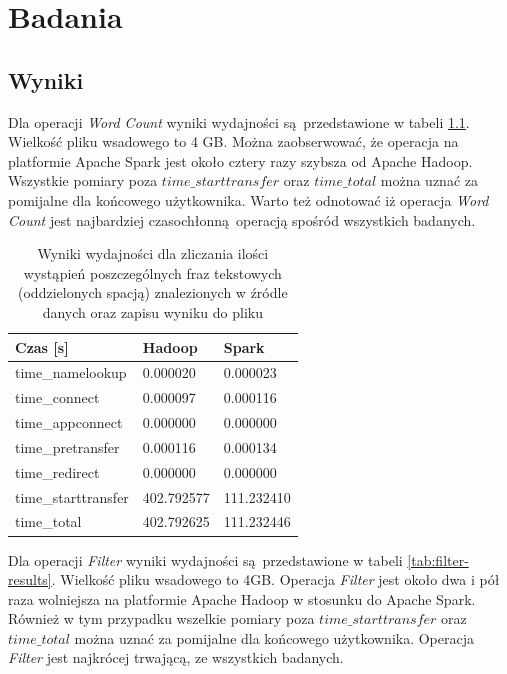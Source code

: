 \chapter{Badania}\label{chap.research}
\section{Wyniki}
Dla operacji \textit{Word Count} wyniki wydajności są przedstawione w tabeli \ref{tab:word-count-results}. Wielkość pliku wsadowego to 4 GB. Można zaobserwować, że operacja na platformie Apache Spark jest około cztery razy szybsza od Apache Hadoop. Wszystkie pomiary poza $time\_starttransfer$ oraz $time\_total$ można uznać za pomijalne dla końcowego użytkownika. Warto też odnotować iż operacja \textit{Word Count} jest najbardziej czasochłonną operacją spośród wszystkich badanych.  
\begin{table}[]
	\centering
	\caption{Wyniki wydajności dla zliczania ilości wystąpień poszczególnych fraz tekstowych (oddzielonych spacją) znalezionych w źródle danych oraz zapisu wyniku do pliku}
	\label{tab:word-count-results}
	\begin{tabular}{|l|l|l|}
		\hline
		Czas [s]    & Hadoop     & Spark      \\ \hline
		time\_namelookup    & 0.000020   & 0.000023   \\ \hline
		time\_connect       & 0.000097   & 0.000116   \\ \hline
		time\_appconnect    & 0.000000   & 0.000000   \\ \hline
		time\_pretransfer   & 0.000116   & 0.000134   \\ \hline
		time\_redirect      & 0.000000   & 0.000000   \\ \hline
		time\_starttransfer & 402.792577 & 111.232410 \\ \hline
		time\_total         & 402.792625 & 111.232446 \\ \hline
	\end{tabular}
\end{table}
\newline Dla operacji \textit{Filter} wyniki wydajności są przedstawione w tabeli \ref{tab:filter-results}. Wielkość pliku wsadowego to 4GB. Operacja \textit{Filter} jest około dwa i pół raza wolniejsza na platformie Apache Hadoop w stosunku do Apache Spark. Również w tym przypadku wszelkie pomiary poza $time\_starttransfer$ oraz $time\_total$ można uznać za pomijalne dla końcowego użytkownika. Operacja \textit{Filter} jest najkrócej trwającą, ze wszystkich badanych. 
